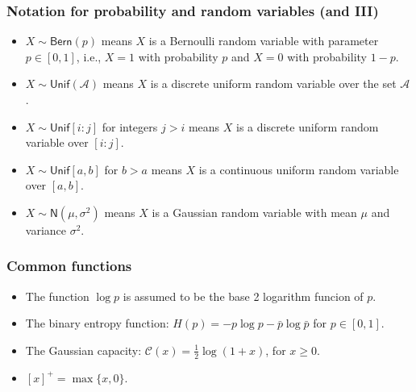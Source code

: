\documentclass{beamer}
\begin{document}
\begin{frame}
\frametitle{Notation for probability and random variables (and III)}
\begin{itemize}
\item $X\sim \mathsf{Bern}(p)$ means $X$ is a Bernoulli random variable with parameter $p\in [0,1]$, i.e., $X=1$ with probability $p$ and $X=0$ with probability $1-p$.
\item $X\sim \mathsf{Unif}(\mathcal A)$ means $X$ is a discrete uniform random variable over the set $\mathcal A$.
\item $X\sim \mathsf{Unif}[i:j]$ for integers $j>i$ means $X$ is a discrete uniform random variable over $[i:j]$.
\item $X\sim \mathsf{Unif}[a,b]$ for $b>a$ means $X$ is a continuous uniform random variable over $[a,b]$.
\item $X\sim \mathsf{N}(\mu, \sigma^2)$ means $X$ is a Gaussian  random variable with mean $\mu$ and variance $\sigma^2$.
\end{itemize}
\end{frame}

\begin{frame}
\frametitle{Common functions}
\begin{itemize}
\item The function $\log p$ is assumed to be the base 2 logarithm funcion of $p$.
\item The binary entropy function: $H(p)=-p\log p - \bar p \log \bar p$ for $p\in [0,1]$.
\item The Gaussian capacity: $\mathcal C(x)=\frac{1}{2}\log(1+x)$, for $x\geq 0$.
\item $[x]^+=\max\{x,0\}$.
\end{itemize}
\end{frame}
\end{document}
